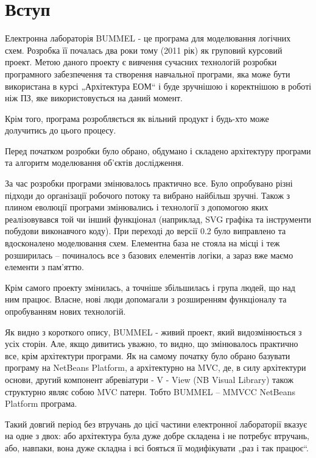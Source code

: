 \documentclass[12pt,a4paper]{article}
\begin{document}
\fontsize{14pt}{6mm}\selectfont

\tableofcontents
\clearpage
\pagestyle{plain}
\section{Вступ}

Електронна лабораторія BUMMEL - це програма для моделювання логічних схем. Розробка її почалась два роки тому (2011 рік) як груповий курсовий проект. Метою даного проекту є вивчення сучасних технологій розробки програмного забезпечення та створення навчальної програми, яка може бути використана в курсі „Архітектура ЕОМ“ і буде зручнішою і коректнішою в роботі ніж ПЗ, яке використовується на даний момент.

Крім того, програма розробляється як вільний продукт \cite{thesis-foss2013} і будь-хто може долучитись до цього процесу.

Перед початком розробки було обрано, обдумано і складено архітектуру програми та алгоритм моделювання об’єктів дослідження.

За час розробки програми змінювалось практично все. Було опробувано різні підходи до організації робочого потоку
та вибрано найбільш зручні. Також з плином еволюції програми змінювались і технології з допомогою яких реалізовувався той чи інший функціонал (наприклад, SVG графіка та інструменти побудови виконавчого коду). При переході до версії 0.2 було виправлено та вдосконалено моделювання схем. Елементна база не стояла на місці і теж розширилась -- починалось все з базових елементів логіки, а зараз вже маємо елементи з пам’яттю.

Крім самого проекту змінилась, а точніше збільшилась і група людей, що над ним працює. Власне, нові люди допомагали з розширенням функціоналу та опробуванням нових технологій.

Як видно з короткого опису, BUMMEL - живий проект, який видозмінюється з усіх сторін. Але, якщо дивитись уважно, то видно, що змінювалось практично все, крім архітектури програми. Як на самому початку було обрано базувати програму на NetBeans Platform, а архітектурно на MVC, де, в силу архітектури основи, другий компонент абревіатури - V - View (NB Visual Library) також структурно являє собою MVC патерн. Тобто BUMMEL -- MMVCC NetBeans Platform програма.

Такий довгий період без втручань до цієї частини електронної лабораторії вказує на одне з двох: або архітектура була дуже добре складена і не потребує втручань, або, навпаки, вона дуже складна і всі бояться її модифікувати „раз і так працює“.
\end{document}
